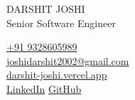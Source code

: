 \documentclass[10pt, a4paper]{article}
\begin{document}
\fontsize{9.2}{12}\selectfont

\begin{minipage}[t]{0.58\textwidth}
  \vspace{0pt}
  {\namefont\fontsize{24}{28}\selectfont DARSHIT JOSHI}\\[3pt]
  {\fontsize{13}{16}\selectfont Senior Software Engineer}
\end{minipage}%
\hfill
\begin{minipage}[t]{0.4\textwidth}
  \vspace{0pt}
  \raggedleft\fontsize{10}{13}\selectfont
  \href{tel:+919328605989}{+91 9328605989}\\
  \href{mailto:joshidarshit2002@gmail.com}{joshidarshit2002@gmail.com}\\
  \href{https://darshit-joshi.vercel.app}{darshit-joshi.vercel.app}\\
  \href{https://www.linkedin.com/in/darshitjoshi2002}{LinkedIn}\enspace
  \href{https://github.com/whojoshi69}{GitHub}
\end{minipage}

\vspace{6pt}
\end{document}
